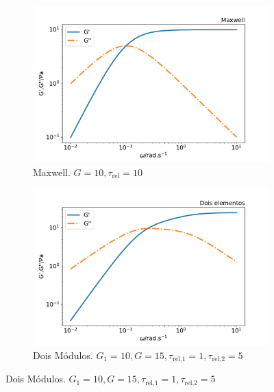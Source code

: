 			\begin{figure}[H]
				\begin{subfigure}[t]{.5\textwidth}
					\centering
					\includegraphics[width=\textwidth]{./imagens/reologia/modelos_comparativo_max}
					\caption{Maxwell. \(G=10, \tau_{\textrm{rel}}=10\)}
					\label{fig:comparativo_modelo_maxwell}
				\end{subfigure}%
				\begin{subfigure}[t]{.5\textwidth}
					\centering
					\includegraphics[width=\textwidth]{./imagens/reologia/modelos_comparativo_doismodos}
					\caption{Dois Módulos. \(G_1=10, G=15, \tau_{\textrm{rel,1}}=1,  \tau_{\textrm{rel,2}}=5\)}
					\label{fig:comparativo_modelo_doismodos}
				\end{subfigure}
			

\end{figure}
